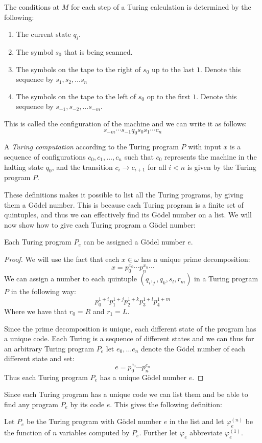 \documentclass[../main.tex]{subfiles}
\begin{document}
The conditions at $M$ for each step of a Turing calculation is determined by
the following:

\begin{enumerate}
	\item The current state $q_i$.
	\item The symbol $s_0$ that is being scanned.
	\item The symbols on the tape to the right of $s_0$ up to the last $1$.
		Denote this sequence by $s_1,s_2,\ldots s_n$
	\item The symbols on the tape to the left of $s_0$ op to the first $1$.
		Denote this sequence by $s_{-1},s_{-2},\ldots s_{-m}$.
\end{enumerate}
This is called the configuration of the machine and we can write it as follows:
$$s_{-m}\cdots s_{-1}q_0s_0s_1\cdots c_n$$

\begin{defi}
	A \textit{Turing computation} according to the Turing program $P$ with input
	$x$ is a sequence of configurations $c_0,c_1,\ldots, c_n$ such that
	$c_0$ represents the machine in the halting state $q_0$, and the
	transition $c_i\rightarrow c_{i+1}$ for all $i<n$ is given by the
	Turing program $P$.
\end{defi}

These definitions makes it possible to list all the Turing programs, by giving
them a Gödel number. This is because each Turing program is a finite set of
quintuples, and thus we can effectively find its Gödel number on a list. We
will now show how to give each Turing program a Gödel number:

\begin{prop}
	Each Turing program $P_e$ can be assigned a Gödel number $e$.
\end{prop}
\begin{proof}
	We will use the fact that each $x\in\omega$ has a unique
	prime decomposition:
	$$x=p_0^{x_0}\cdots p_n^{x_n}\cdots$$
	We can assign a number to each quintuple $(q_i,_j,q_k,s_l,r_m)$ in a
	Turing program $P$ in the following way:
	$$p_0^{1+i}p_1^{1+j}p_2^{1+k}p_3^{1+l}p_4^{1+m}$$
	Where we have that $r_0=R$ and $r_1=L$. 

	Since the prime decomposition
	is unique, each different state of the program has a unique code. Each Turing
	is a sequence of different states and we can thus for an arbitrary
	Turing program $P_e$ let $e_0,\ldots e_n$ denote the Gödel number of
	each different state and set:
	$$e=p_0^{e_0}\cdots p_n^{e_n}$$
	Thus each Turing program $P_e$ has a unique Gödel number $e$.
\end{proof}
Since each Turing program has a unique code we can list them and be able to
find any program $P_e$ by its code $e$. This gives the following definition:
\begin{defi}
	Let $P_e$ be the Turing program with Gödel number $e$ in the list and
	let $\varphi_e^{(n)}$ be the function of $n$ variables computed by $P_e$.
	Further let $\varphi_e$ abbreviate $\varphi_e^{(1)}$.
\end{defi}
\end{document}
